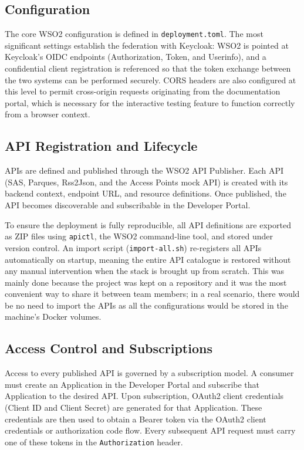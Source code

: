 \documentclass[12pt, a4paper]{report}
\begin{document}
\subsection{Configuration}
The core WSO2 configuration is defined in \texttt{deployment.toml}. The most significant
settings establish the federation with Keycloak: WSO2 is pointed at Keycloak's OIDC
endpoints (Authorization, Token, and Userinfo), and a confidential client registration is
referenced so that the token exchange between the two systems can be performed securely.
CORS headers are also configured at this level to permit cross-origin requests originating
from the documentation portal, which is necessary for the interactive testing feature to
function correctly from a browser context.

\subsection{API Registration and Lifecycle}
APIs are defined and published through the WSO2 API Publisher. Each API (SAS, Parques,
Rss2Json, and the Access Points mock API) is created with its backend context, endpoint
URL, and resource definitions. Once published, the API becomes discoverable and
subscribable in the Developer Portal.

To ensure the deployment is fully reproducible, all API definitions are exported as ZIP
files using \texttt{apictl}, the WSO2 command-line tool, and stored under version control.
An import script (\texttt{import-all.sh}) re-registers all APIs automatically on startup,
meaning the entire API catalogue is restored without any manual intervention when the
stack is brought up from scratch. This was mainly done because the project was kept on a
repository and it was the most convenient way to share it between team members; in a real
scenario, there would be no need to import the APIs as all the configurations would be
stored in the machine's Docker volumes.

\subsection{Access Control and Subscriptions}
Access to every published API is governed by a subscription model. A consumer must create
an Application in the Developer Portal and subscribe that Application to the desired API.
Upon subscription, OAuth2 client credentials (Client ID and Client Secret) are generated
for that Application. These credentials are then used to obtain a Bearer token via the
OAuth2 client credentials or authorization code flow. Every subsequent API request must
carry one of these tokens in the \texttt{Authorization} header.
\end{document}
